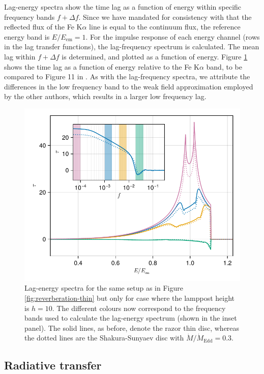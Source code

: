 \documentclass[fleqn,usenatbib]{mnras}
\newcommand{\FeKa}{Fe K$\alpha$\xspace}
\begin{document}
Lag-energy spectra show the time lag as a function of energy within specific frequency bands $f + \Delta
f$. Since we have mandated for consistency with \cite{cackett_modelling_2014}
that the reflected flux of the \FeKa line is equal to the continuum flux,
the reference energy band is $E/E_\text{em} = 1$.  For the impulse response of
each energy channel (rows in the lag transfer functions), the lag-frequency
spectrum is calculated. The mean lag within $f + \Delta f$ is determined, and
plotted as a function of energy. Figure \ref{fig:lag-energy} shows
the time lag as a function of energy relative to the \FeKa band,
to be compared to Figure 11 in \cite{cackett_modelling_2014}. As with the
lag-frequency spectra, we attribute the differences in the low frequency band to
the weak field approximation employed by the other authors, which results in a
larger low frequency lag.

\begin{figure}
	\centering
	\includegraphics[width=0.98\linewidth]{figures/reverberation.lag-energy.pdf}
	\caption{Lag-energy spectra for the same setup as in Figure
    \ref{fig:reverberation-thin} but only for case where the lamppost height is
$h=10$. The different colours now correspond to the frequency bands used to
calculate the lag-energy spectrum (shown in the inset panel). The solid lines,
as before, denote the razor thin disc, whereas the dotted lines are the
Shakura-Sunyaev disc with $\dot{M} / \dot{M}_\text{Edd} =0.3$.}
	\label{fig:lag-energy}
\end{figure}


\subsection{Radiative transfer}
\end{document}

